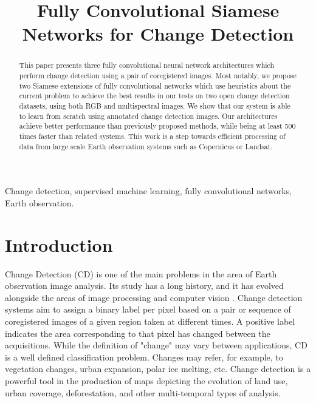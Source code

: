\documentclass{article}
\title{Fully Convolutional Siamese Networks for Change Detection}
\begin{document}
\maketitle
\begin{abstract}
This paper presents three fully convolutional neural network architectures which perform change detection using a pair of coregistered images. Most notably, we propose two Siamese extensions of fully convolutional networks which use heuristics about the current problem to achieve the best results in our tests on two open change detection datasets, using both RGB and multispectral images. We show that our system is able to learn from scratch using annotated change detection images. Our architectures achieve better performance than previously proposed methods, while being at least 500 times faster than related systems. This work is a step towards efficient processing of data from large scale Earth observation systems such as Copernicus or Landsat.
\end{abstract}
\begin{keywords}
Change detection, supervised machine learning, fully convolutional networks, Earth observation.
\end{keywords}
\section{Introduction}
\label{sec:intro}

Change Detection (CD) is one of the main problems in the area of Earth observation image analysis. Its study has a long history, and it has evolved alongside the areas of image processing and computer vision \cite{singh1989review,hussain2013change}. Change detection systems aim to assign a binary label per pixel based on a pair or sequence of coregistered images of a given region taken at different times. A positive label indicates the area corresponding to that pixel has changed between the acquisitions. While the definition of "change" may vary between applications, CD is a well defined classification problem. Changes may refer, for example, to vegetation changes, urban expansion, polar ice melting, etc. Change detection is a powerful tool in the production of maps depicting the evolution of land use, urban coverage, deforestation, and other multi-temporal types of analysis.
\end{document}
